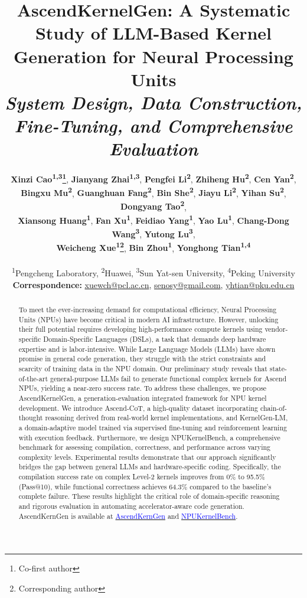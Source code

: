 \documentclass[11pt]{article}
\title{
\Large\textbf{AscendKernelGen: A Systematic Study of LLM-Based Kernel Generation for Neural Processing Units}\\[0.6ex]
\small\textit{System Design, Data Construction, Fine-Tuning, and Comprehensive Evaluation}
}
\author{
 \textbf{Xinzi Cao\textsuperscript{1,3}\thanks{Co-first author}},
 \textbf{Jianyang Zhai\textsuperscript{1,3}\footnotemark[1]},
 \textbf{Pengfei Li\textsuperscript{2}\footnotemark[1]},
 \textbf{Zhiheng Hu\textsuperscript{2}\footnotemark[1]},
 \textbf{Cen Yan\textsuperscript{2}},
 \\
 \textbf{Bingxu Mu\textsuperscript{2}},
 \textbf{Guanghuan Fang\textsuperscript{2}},
 \textbf{Bin She\textsuperscript{2}},
 \textbf{Jiayu Li\textsuperscript{2}},
 \textbf{Yihan Su\textsuperscript{2}}, 
 \textbf{Dongyang Tao\textsuperscript{2}},
 \\
 \textbf{Xiansong Huang\textsuperscript{1}},
 \textbf{Fan Xu\textsuperscript{1}},
 \textbf{Feidiao Yang\textsuperscript{1}},
 \textbf{Yao Lu\textsuperscript{1}},
 \textbf{Chang-Dong Wang\textsuperscript{3}},
 \textbf{Yutong Lu\textsuperscript{3}},
\\
 \textbf{Weicheng Xue\textsuperscript{1}\thanks{Corresponding author}},
 \textbf{Bin Zhou\textsuperscript{1}\footnotemark[2]},
 \textbf{Yonghong Tian\textsuperscript{1,4}\footnotemark[2]}
\\
\\
 \textsuperscript{1}Pengcheng Laboratory,
 \textsuperscript{2}Huawei,
 \textsuperscript{3}Sun Yat-sen University,
 \textsuperscript{4}Peking University
\\
 \small{
   \textbf{Correspondence:} \href{mailto:xuewch@pcl.ac.cn}{xuewch@pcl.ac.cn}, 
   \href{mailto:senosy@gmail.com}{senosy@gmail.com},
   \href{mailto:yhtian@pku.edu.cn}{yhtian@pku.edu.cn}
 }
}
\begin{document}
\maketitle
\begin{abstract}
To meet the ever-increasing demand for computational efficiency, Neural Processing Units (NPUs) have become critical in modern AI infrastructure. However, unlocking their full potential requires developing high-performance compute kernels using vendor-specific Domain-Specific Languages (DSLs), a task that demands deep hardware expertise and is labor-intensive. While Large Language Models (LLMs) have shown promise in general code generation, they struggle with the strict constraints and scarcity of training data in the NPU domain. Our preliminary study reveals that state-of-the-art general-purpose LLMs fail to generate functional complex kernels for Ascend NPUs, yielding a near-zero success rate. To address these challenges, we propose AscendKernelGen, a generation-evaluation integrated framework for NPU kernel development. We introduce Ascend-CoT, a high-quality dataset incorporating chain-of-thought reasoning derived from real-world kernel implementations, and KernelGen-LM, a domain-adaptive model trained via supervised fine-tuning and reinforcement learning with execution feedback. Furthermore, we design NPUKernelBench, a comprehensive benchmark for assessing compilation, correctness, and performance across varying complexity levels. Experimental results demonstrate that our approach significantly bridges the gap between general LLMs and hardware-specific coding. Specifically, the compilation success rate on complex Level-2 kernels improves from 0\% to 95.5\% (Pass@10), while functional correctness achieves 64.3\% compared to the baseline's complete failure. These results highlight the critical role of domain-specific reasoning and rigorous evaluation in automating accelerator-aware code generation. AscendKernGen is available at \href{https://huggingface.co/AscendKernelGen}{\textcolor{blue}{AscendKernGen}} and \href{https://github.com/weich97/NPUKernelBench}{\textcolor{blue}{NPUKernelBench}}.
\end{abstract}










\clearpage


\end{document}
